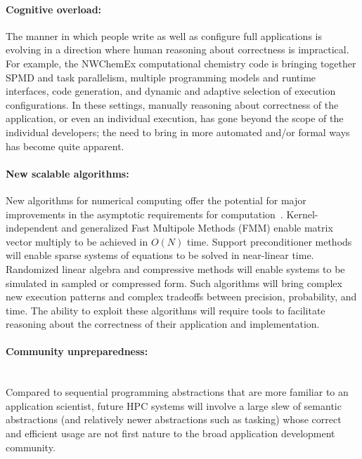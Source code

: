 \paragraph{Cognitive overload:}
The manner in which people write as well as
configure full applications is
evolving in a direction where human reasoning about correctness is impractical.
  For example, the NWChemEx computational chemistry code is bringing together SPMD and task parallelism, multiple programming models and runtime interfaces, code generation, and dynamic and adaptive selection of execution configurations. 
In these settings, manually reasoning about correctness of the application, or even an individual execution, has gone beyond the scope of the individual developers;
the need to bring in more automated and/or
formal ways has become quite apparent.



\paragraph{New scalable algorithms:}
New algorithms for numerical computing offer the potential for major improvements in the asymptotic requirements for computation~\cite{ascac-2017}.  Kernel-independent and generalized Fast Multipole Methods (FMM) enable matrix vector multiply to be achieved in $O(N)$ time.  Support preconditioner methods will enable sparse systems of equations to be solved in near-linear time.  Randomized linear algebra and compressive methods will enable systems to be simulated in sampled or compressed form.  Such algorithms will bring complex new execution patterns and complex tradeoffs between precision, probability, and time.  The ability to exploit these algorithms will require tools to facilitate reasoning about the correctness of their application and implementation.




  
\paragraph{Community unpreparedness:} \mbox{ }\\
  Compared to sequential programming abstractions that are more familiar
  to an application scientist, future HPC systems will involve a large
 slew of semantic abstractions (and relatively
 newer abstractions such as tasking)
 whose correct and efficient usage are
  not first nature to the broad application development community.
 
